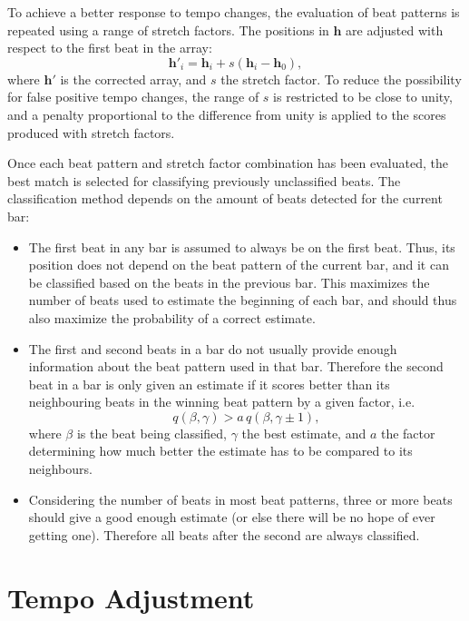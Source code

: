 To achieve a better response to tempo changes,
the evaluation of beat patterns is repeated
using a range of stretch factors.
The positions in $\mathbf{h}$ are
adjusted with respect to the first beat in the array:
\begin{equation}
\mathbf{h}'_i = \mathbf{h}_i + s(\mathbf{h}_i - \mathbf{h}_0),
\end{equation}
where $\mathbf{h}'$ is the corrected array,
and $s$ the stretch factor.
To reduce the possibility for false positive tempo changes,
the range of $s$ is restricted to be close to unity,
and a penalty proportional to the difference from unity
is applied to the scores produced with stretch factors.

Once each beat pattern and stretch factor combination
has been evaluated,
the best match is selected for classifying previously unclassified beats.
The classification method depends on
the amount of beats detected for the current bar:
\begin{itemize}
\item The first beat in any bar is assumed to always be on the first beat.
Thus, its position does not depend on the beat pattern of the current bar,
and it can be classified based on the beats in the previous bar.
This maximizes the number of beats used
to estimate the beginning of each bar,
and should thus also maximize the probability of a correct estimate.
\item The first and second beats in a bar do not usually
provide enough information about the beat pattern used in that bar.
Therefore the second beat in a bar is only given an estimate if
it scores better than its neighbouring beats in the winning beat pattern
by a given factor, i.e.
\begin{equation}
q(\beta,\gamma) > a \, q(\beta, \gamma \pm 1),
\end{equation}
where $\beta$ is the beat being classified,
$\gamma$ the best estimate,
and $a$ the factor determining how much better the
estimate has to be compared to its neighbours.
\item Considering the number of beats in most beat patterns,
three or more beats should give a good enough estimate
(or else there will be no hope of ever getting one).
Therefore all beats after the second are always classified.
\end{itemize}

\section{Tempo Adjustment}
\label{sec:tempo_adjustment}

